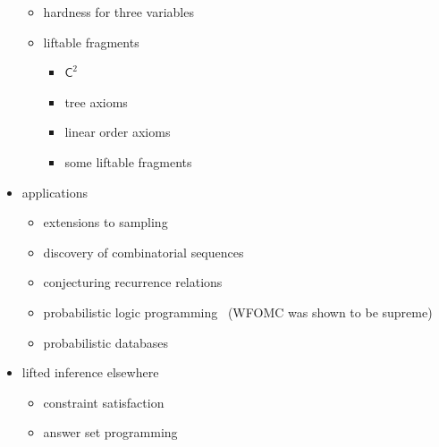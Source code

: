 \documentclass{article}
\theoremstyle{definition}
\theoremstyle{remark}
\newcommand{\Ctwo}{$\mathsf{C}^{2}$}
\begin{document}
\begin{itemize}
\begin{itemize}
          \item hardness for three variables~\cite{DBLP:conf/pods/BeameBGS15}
          \item liftable fragments
                \begin{itemize}
                  \item \Ctwo~\cite{DBLP:journals/jair/Kuzelka21}
                  \item tree axioms~\cite{DBLP:journals/ai/BremenK23}
                  \item linear order axioms~\cite{DBLP:conf/aaai/TothK23}
                  \item some liftable fragments~\cite{DBLP:conf/nips/KazemiKBP16}
                \end{itemize}
        \end{itemize}
  \item applications
        \begin{itemize}
          \item extensions to
                sampling~\cite{DBLP:conf/aaai/WangB0K22,DBLP:conf/lics/WangP0K23}
          \item discovery of combinatorial
                sequences~\cite{DBLP:conf/ijcai/SvatosJT0K23}
          \item conjecturing recurrence
                relations~\cite{DBLP:conf/ilp/BarvinekB0ZK21}
          \item probabilistic logic
                programming~\cite{DBLP:journals/ijar/RiguzziBZCL17} (WFOMC was
                shown to be supreme)
          \item probabilistic databases~\cite{DBLP:journals/debu/GribkoffSB14}
        \end{itemize}
  \item lifted inference elsewhere
        \begin{itemize}
          \item constraint satisfaction~\cite{DBLP:journals/jair/TotisDRK23}
          \item answer set programming~\cite{DBLP:journals/ijar/AzzoliniR23}
        \end{itemize}
\end{itemize}
\end{document}
